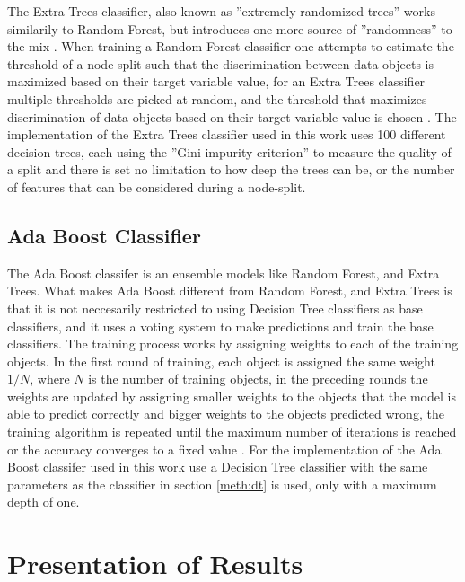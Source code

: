 The Extra Trees classifier, also known as ''extremely randomized trees'' works similarily to Random Forest, but introduces one more source of ''randomness'' to the mix \cite{scikit_learn}. When training a Random Forest classifier one attempts to estimate the threshold of a node-split such that the discrimination between data objects is maximized based on their target variable value, for an Extra Trees classifier multiple thresholds are picked at random, and the threshold that maximizes discrimination of data objects based on their target variable value is chosen \cite{scikit_learn}. The implementation of the Extra Trees classifier used in this work uses 100 different decision trees, each using the ''Gini impurity criterion'' to measure the quality of a split and there is set no limitation to how deep the trees can be, or the number of features that can be considered during a node-split.

\subsection{Ada Boost Classifier}
The Ada Boost classifer is an ensemble models like Random Forest, and Extra Trees. What makes Ada Boost different from Random Forest, and Extra Trees is that it is not neccesarily restricted to using Decision Tree classifiers as base classifiers, and it uses a voting system to make predictions and train the base classifiers. The training process works by assigning weights to each of the training objects. In the first round of training, each object is assigned the same weight $1/N$, where $N$ is the number of training objects, in the preceding rounds the weights are updated by assigning smaller weights to the objects that the model is able to predict correctly and bigger weights to the objects predicted wrong, the training algorithm is repeated until the maximum number of iterations is reached or the accuracy converges to a fixed value \cite{scikit_learn}. For the implementation of the Ada Boost classifer used in this work use a Decision Tree classifier with the same parameters as the classifier in section \ref{meth:dt} is used, only with a maximum depth of one.

\section{Presentation of Results}

